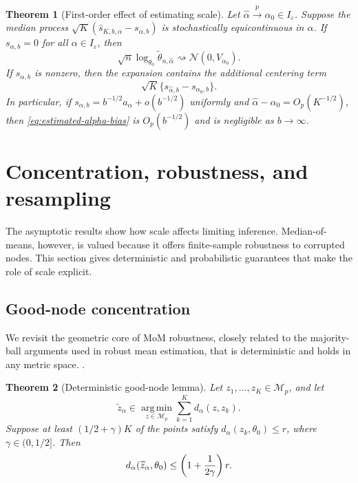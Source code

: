 \documentclass[11pt]{article}
\newtheorem{theorem}{Theorem}
\newcommand{\argmin}{\operatorname*{arg\,min}}
\newcommand{\dto}{\rightsquigarrow}
\newcommand{\pto}{\stackrel{p}{\to}}
\newcommand{\Normal}{\mathcal N}
\newcommand{\M}{\mathcal M}
\newcommand{\eps}{\varepsilon}
\begin{document}
\begin{theorem}[First-order effect of estimating scale]\label{thm:estimated-alpha}
Let \(\widehat\alpha\pto\alpha_0\in I_\eps\).  Suppose the median process \(\sqrt K(\widehat s_{K,b,\alpha}-s_{\alpha,b})\) is stochastically equicontinuous in \(\alpha\).  If \(s_{\alpha,b}=0\) for all \(\alpha\in I_\eps\), then
\begin{equation}\label{eq:estimated-alpha-centered}
    \sqrt n\log_{\theta_0}\widetilde\theta_{n,\widehat\alpha}
    \dto \Normal(0,V_{\alpha_0}).
\end{equation}
If \(s_{\alpha,b}\) is nonzero, then the expansion contains the additional centering term
\begin{equation}\label{eq:estimated-alpha-bias}
    \sqrt K\{s_{\widehat\alpha,b}-s_{\alpha_0,b}\}.
\end{equation}
In particular, if \(s_{\alpha,b}=b^{-1/2}a_\alpha+o(b^{-1/2})\) uniformly and \(\widehat\alpha-\alpha_0=O_p(K^{-1/2})\), then \eqref{eq:estimated-alpha-bias} is \(O_p(b^{-1/2})\) and is negligible as \(b\to\infty\).
\end{theorem}


\section{Concentration, robustness, and resampling}\label{sec:robustness}

The asymptotic results show how scale affects limiting inference.  Median-of-means, however, is valued because it offers finite-sample robustness to corrupted nodes.  This section gives deterministic and probabilistic guarantees that make the role of scale explicit.

\subsection{Good-node concentration}

We revisit the geometric core of MoM robustness, closely related to the majority-ball arguments used in robust mean estimation, that is deterministic and holds in any metric space. \citep{minsker_2015_GeometricMedianRobust, lugosi_2019_SubGaussianEstimatorsMean}.

\begin{theorem}[Deterministic good-node lemma]\label{thm:good-node}
Let \(z_1,
\ldots,z_K\in\M_p\), and let
\[
    \widetilde z_\alpha\in\argmin_{z\in\M_p}\sum_{k=1}^K d_\alpha(z,z_k).
\]
Suppose at least \((1/2+\gamma)K\) of the points satisfy \(d_\alpha(z_k,\theta_0)\le r\), where \(\gamma\in(0,1/2]\).  Then
\begin{equation}\label{eq:good-node-bound}
    d_\alpha(\widetilde z_\alpha,\theta_0)
    \le \left(1+{1\over 2\gamma}\right)r.
\end{equation}
\end{theorem}
\end{document}
